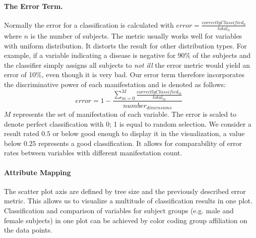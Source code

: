 \documentclass[a4paper,twoside]{style/article}
\begin{document}
\paragraph{The Error Term. }
Normally the error for a classification is calculated with $error = \frac{correctlyClassified_{n}} {total_{n}}$ where $n$ is the number of subjects.
The metric usually works well for variables with uniform distribution.
It distorts the result for other distribution types.
For example, if a variable indicating a disease is negative for 90\% of the subjects and the classifier simply assigns all subjects to \emph{not ill} the error metric would yield an error of 10\%, even though it is very bad.
Our error term therefore incorporates the discriminative power of each manifestation and is denoted as follows:
\begin{equation}
error = 1 - \frac{\sum_{m=0}^M \frac{correctlyClassified_{m}}{total_{m}}}{number_{dimensions}}
\end{equation}
$M$ represents the set of manifestation of each variable.
The error is scaled to denote perfect classification with 0; 1 is equal to random selection.
We consider a result rated $0.5$ or below good enough to display it in the visualization, a value below $0.25$ represents a good classification.
It allows for comparability of error rates between variables with different manifestation count.

\paragraph{Attribute Mapping}
The scatter plot axis are defined by tree size and the previously described error metric.
This allows us to visualize a multitude of classification results in one plot.
Classification and comparison of variables for subject groups (e.g. male and female subjects) in one plot can be achieved by color coding group affiliation on the data points.
\end{document}
